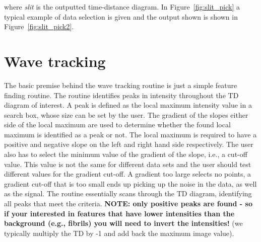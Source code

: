 \documentclass{article}
\begin{document}
where \textit{slit} is the outputted time-distance diagram. In Figure~\ref{fig:slit_pick} a typical example of data selection is given and the output shown is shown in Figure~\ref{fig:slit_pick2}.








\section{Wave tracking}
The basic premise behind the wave tracking routine is just a simple feature finding routine. The routine identifies peaks in intensity throughout the TD diagram of interest. A peak is defined as the local maximum intensity value in a search box, whose size can be set by the user. The gradient of the slopes either side of the local maximum are used to determine whether the found local maximum is identified as a peak or not. The local maximum is required to have a positive and negative slope on the left and right hand side respectively. The user also has to select the minimum value of the gradient of the slope, i.e., a cut-off value. This value is not the same for different data sets and the user should test different values for the gradient cut-off. A gradient too large selects no points, a gradient cut-off that is too small ends up picking up the noise in the data, as well as the signal. The routine essentially scans through the TD diagram, identifying all peaks that meet the criteria. \textbf{NOTE: only positive peaks are found - so if your interested in features that have lower intensities than the background (e.g., fibrils) you will need to invert the intensities!} (we typically multiply the TD by -1 and add back the maximum image value).
\end{document}
